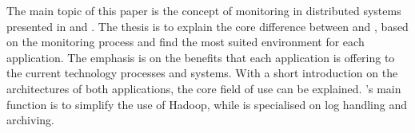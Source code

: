 
The main topic of this paper is the concept of monitoring in distributed systems presented in \ambshort and \chukshort. 
The thesis is to explain the core difference between \ambshort and \chukshort, based on the monitoring process and find the most suited environment for each application. 
The emphasis is on the benefits that each application is offering to the current technology processes and systems. 
With a short introduction on the architectures of both applications, the core field of use can be explained. 
\ambshort's main function is to simplify the use of Hadoop, while \chukshort is specialised on log handling and archiving.